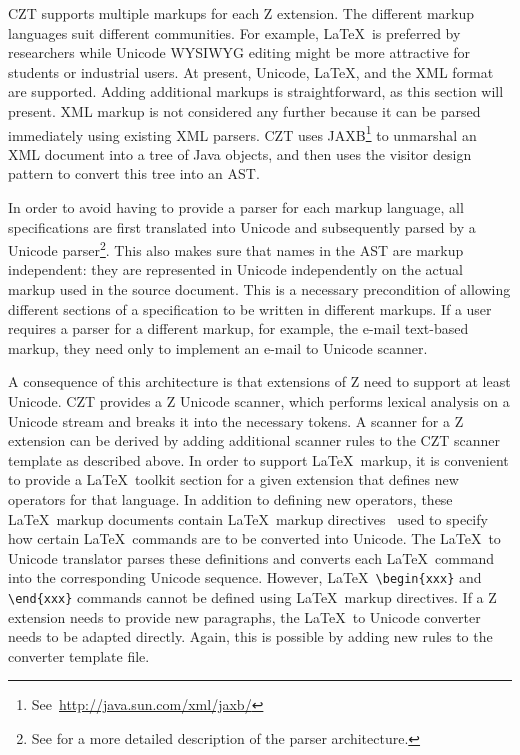 \documentclass{llncs}
\begin{document}
 CZT supports multiple markups for each Z extension.  The different
 markup languages suit different communities.  For example, \LaTeX\ is
 preferred by researchers while Unicode WYSIWYG editing might be more
 attractive for students or industrial users. At present, Unicode,
 \LaTeX, and the XML format are supported.  Adding additional markups
 is straightforward, as this section will present.  XML markup is not
 considered any further because it can be parsed immediately using
 existing XML parsers.  CZT uses
 JAXB\footnote{See~\url{http://java.sun.com/xml/jaxb/}} to unmarshal an
 XML document into a tree of Java objects, and then uses the visitor
 design pattern to convert this tree into an AST.

In order to avoid having to provide a parser for each markup language,
all specifications are first translated into Unicode and subsequently
parsed by a Unicode parser\footnote{See \cite{czt} for a more detailed
description of the parser architecture.}.  This also makes sure that
names in the AST are markup independent: they are represented in
Unicode independently on the actual markup used in the source
document.  This is a necessary precondition of allowing different
sections of a specification to be written in different markups.  If a
user requires a parser for a different markup, for example, the e-mail
text-based markup, they need only to implement an e-mail to Unicode
scanner.

A consequence of this architecture is that extensions of Z need
to support at least Unicode.  CZT provides a Z Unicode scanner, which
performs lexical analysis on a Unicode stream and breaks it into the
necessary tokens.  A scanner for a Z extension can be derived by
adding additional scanner rules to the CZT scanner template as
described above.  In order to support \LaTeX\ markup, it is convenient
to provide a \LaTeX\ toolkit section for a given extension that
defines new operators for that language.  In
addition to defining new operators, these \LaTeX\ markup documents
contain \LaTeX\ markup directives~\cite{isoz,czt} used to specify how
certain \LaTeX\ commands are to be converted into Unicode.  The
\LaTeX\ to Unicode translator parses these definitions and converts
each \LaTeX\ command into the corresponding Unicode sequence.
However, \LaTeX\ \verb+\begin{xxx}+ and \verb+\end{xxx}+ commands
cannot be defined using \LaTeX\ markup directives.  If a Z extension
needs to provide new paragraphs, the \LaTeX\ to Unicode converter
needs to be adapted directly.  Again, this is possible by adding new
rules to the converter template file.
\end{document}
